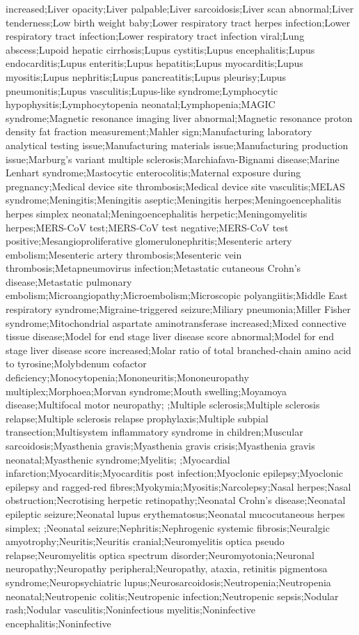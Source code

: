 \begin{refsection}
\begin{tcolorbox}[quote]
increased;Liver opacity;Liver palpable;Liver sarcoidosis;Liver scan abnormal;Liver tenderness;Low birth weight baby;Lower respiratory tract herpes infection;Lower respiratory tract infection;Lower respiratory tract infection viral;Lung abscess;Lupoid hepatic cirrhosis;Lupus cystitis;Lupus encephalitis;Lupus endocarditis;Lupus enteritis;Lupus hepatitis;Lupus myocarditis;Lupus myositis;Lupus nephritis;Lupus pancreatitis;Lupus pleurisy;Lupus pneumonitis;Lupus vasculitis;Lupus-like syndrome;Lymphocytic hypophysitis;Lymphocytopenia neonatal;Lymphopenia;MAGIC syndrome;Magnetic resonance imaging liver abnormal;Magnetic resonance proton density fat fraction measurement;Mahler sign;Manufacturing laboratory analytical testing issue;Manufacturing materials issue;Manufacturing production issue;Marburg's variant multiple sclerosis;Marchiafava-Bignami disease;Marine Lenhart syndrome;Mastocytic enterocolitis;Maternal exposure during pregnancy;Medical device site thrombosis;Medical device site vasculitis;MELAS syndrome;Meningitis;Meningitis aseptic;Meningitis herpes;Meningoencephalitis herpes simplex neonatal;Meningoencephalitis herpetic;Meningomyelitis herpes;MERS-CoV test;MERS-CoV test negative;MERS-CoV test positive;Mesangioproliferative glomerulonephritis;Mesenteric artery embolism;Mesenteric artery thrombosis;Mesenteric vein thrombosis;Metapneumovirus infection;Metastatic cutaneous Crohn's disease;Metastatic pulmonary embolism;Microangiopathy;Microembolism;Microscopic polyangiitis;Middle East respiratory syndrome;Migraine-triggered seizure;Miliary pneumonia;Miller Fisher syndrome;Mitochondrial aspartate aminotransferase increased;Mixed connective tissue disease;Model for end stage liver disease score abnormal;Model for end stage liver disease score increased;Molar ratio of total branched-chain amino acid to tyrosine;Molybdenum cofactor deficiency;Monocytopenia;Mononeuritis;Mononeuropathy multiplex;Morphoea;Morvan syndrome;Mouth swelling;Moyamoya disease;Multifocal motor neuropathy; ;Multiple sclerosis;Multiple sclerosis relapse;Multiple sclerosis relapse prophylaxis;Multiple subpial transection;Multisystem inflammatory syndrome in children;Muscular sarcoidosis;Myasthenia gravis;Myasthenia gravis crisis;Myasthenia gravis neonatal;Myasthenic syndrome;Myelitis; ;Myocardial infarction;Myocarditis;Myocarditis post infection;Myoclonic epilepsy;Myoclonic epilepsy and ragged-red fibres;Myokymia;Myositis;Narcolepsy;Nasal herpes;Nasal obstruction;Necrotising herpetic retinopathy;Neonatal Crohn's disease;Neonatal epileptic seizure;Neonatal lupus erythematosus;Neonatal mucocutaneous herpes simplex; ;Neonatal seizure;Nephritis;Nephrogenic systemic fibrosis;Neuralgic amyotrophy;Neuritis;Neuritis cranial;Neuromyelitis optica pseudo relapse;Neuromyelitis optica spectrum disorder;Neuromyotonia;Neuronal neuropathy;Neuropathy peripheral;Neuropathy, ataxia, retinitis pigmentosa syndrome;Neuropsychiatric lupus;Neurosarcoidosis;Neutropenia;Neutropenia neonatal;Neutropenic colitis;Neutropenic infection;Neutropenic sepsis;Nodular rash;Nodular vasculitis;Noninfectious myelitis;Noninfective encephalitis;Noninfective 
\end{tcolorbox}
\end{refsection}
